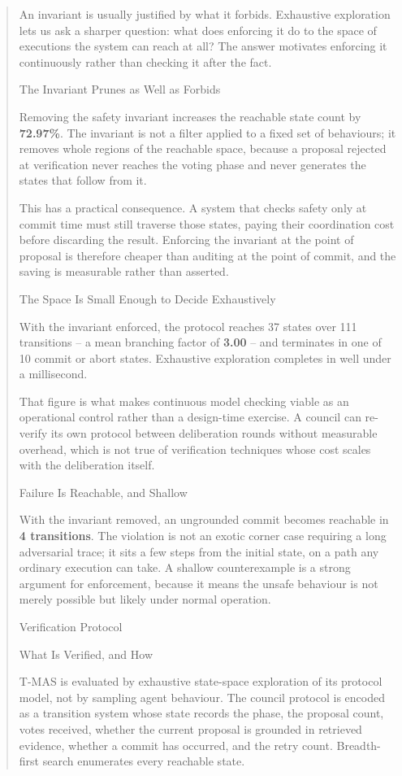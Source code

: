 \documentclass[10pt,journal,compsoc,twocolumn]{IEEEtran}
\begin{document}
\begin{quote}
{An invariant is usually justified by what it forbids. Exhaustive exploration lets
us ask a sharper question: what does enforcing it do to the space of executions the
system can reach at all? The answer motivates enforcing it continuously rather than
checking it after the fact.

 The Invariant Prunes as Well as Forbids

Removing the safety invariant increases the reachable state count by
\textbf{72.97\%}. The invariant is not a filter
applied to a fixed set of behaviours; it removes whole regions of the reachable
space, because a proposal rejected at verification never reaches the voting phase
and never generates the states that follow from it.

This has a practical consequence. A system that checks safety only at commit time
must still traverse those states, paying their coordination cost before discarding
the result. Enforcing the invariant at the point of proposal is therefore cheaper
than auditing at the point of commit, and the saving is measurable rather than
asserted.

 The Space Is Small Enough to Decide Exhaustively

With the invariant enforced, the protocol reaches
37 states over 111
transitions -- a mean branching factor of
\textbf{3.00} -- and terminates in one of
10 commit or abort states. Exhaustive exploration
completes in well under a millisecond.

That figure is what makes continuous model checking viable as an operational
control rather than a design-time exercise. A council can re-verify its own
protocol between deliberation rounds without measurable overhead, which is not true
of verification techniques whose cost scales with the deliberation itself.

 Failure Is Reachable, and Shallow

With the invariant removed, an ungrounded commit becomes reachable in
\textbf{4 transitions}. The violation is
not an exotic corner case requiring a long adversarial trace; it sits a few steps
from the initial state, on a path any ordinary execution can take. A shallow
counterexample is a strong argument for enforcement, because it means the unsafe
behaviour is not merely possible but likely under normal operation.



 Verification Protocol

 What Is Verified, and How

T-MAS is evaluated by exhaustive state-space exploration of its protocol model, not by sampling agent behaviour. The council protocol is encoded as a transition system whose state records the phase, the proposal count, votes received, whether the current proposal is grounded in retrieved evidence, whether a commit has occurred, and the retry count. Breadth-first search enumerates every reachable state.

}
\end{quote}
\end{document}
